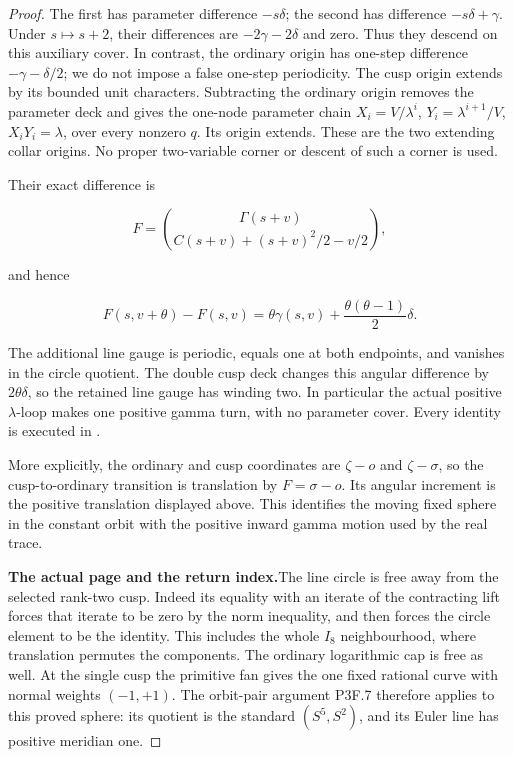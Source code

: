 \begin{proof}
The first has parameter difference \(-s\delta\); the second
has difference \(-s\delta+\gamma\).  Under \(s\mapsto s+2\),
their differences are \(-2\gamma-2\delta\) and zero.  Thus
they descend on this auxiliary cover.  In contrast, the ordinary
origin has one-step difference \(-\gamma-\delta/2\); we do
not impose a false one-step periodicity.  The cusp origin extends
by its bounded unit characters.  Subtracting the ordinary origin
removes the parameter deck and gives the one-node parameter chain
\(X_i=V/\lambda^i\), \(Y_i=\lambda^{i+1}/V\),
\(X_iY_i=\lambda\), over every nonzero \(q\).  Its origin
extends.  These are the two extending collar origins.  No proper
two-variable corner or descent of such a corner is used.

Their exact difference is

\[
 F=\binom{\Gamma(s+v)}{C(s+v)+(s+v)^2/2-v/2},
\]

and hence

\[
 F(s,v+\theta)-F(s,v)
 =\theta\gamma(s,v)+\frac{\theta(\theta-1)}2\delta.
\]

The additional line gauge is periodic, equals one at both
endpoints, and vanishes in the circle quotient.  The double cusp
deck changes this angular difference by \(2\theta\delta\),
so the retained line gauge has winding two.  In particular the
actual positive \(\lambda\)-loop makes one positive gamma turn,
with no parameter cover.  Every identity is executed in
.

More explicitly, the ordinary and cusp coordinates are
\(\zeta-o\) and \(\zeta-\sigma\), so the cusp-to-ordinary
transition is translation by \(F=\sigma-o\). Its angular
increment is the positive translation displayed above. This
identifies the moving fixed sphere in the constant orbit with
the positive inward gamma motion used by the real trace.

\par\medskip\noindent\textbf{The actual page and the return index.}\enspace The line circle is
free away from the selected rank-two cusp.  Indeed its equality
with an iterate of the contracting lift forces that iterate to
be zero by the norm inequality, and then forces the circle
element to be the identity.  This includes the whole \(I_8\)
neighbourhood, where translation permutes the components.  The
ordinary logarithmic cap is free as well.  At the single cusp
the primitive fan gives the one fixed rational curve with normal
weights \((-1,+1)\).  The orbit-pair argument P3F.7 therefore
applies to this proved sphere: its quotient is the standard
\((S^5,S^2)\), and its Euler line has positive meridian one.


\end{proof}
